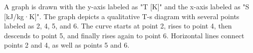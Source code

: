 A graph is drawn with the y-axis labeled as "T [K]" and the x-axis labeled as "S [kJ/kg·K]". The graph depicts a qualitative T-s diagram with several points labeled as 2, 4, 5, and 6. The curve starts at point 2, rises to point 4, then descends to point 5, and finally rises again to point 6. Horizontal lines connect points 2 and 4, as well as points 5 and 6.